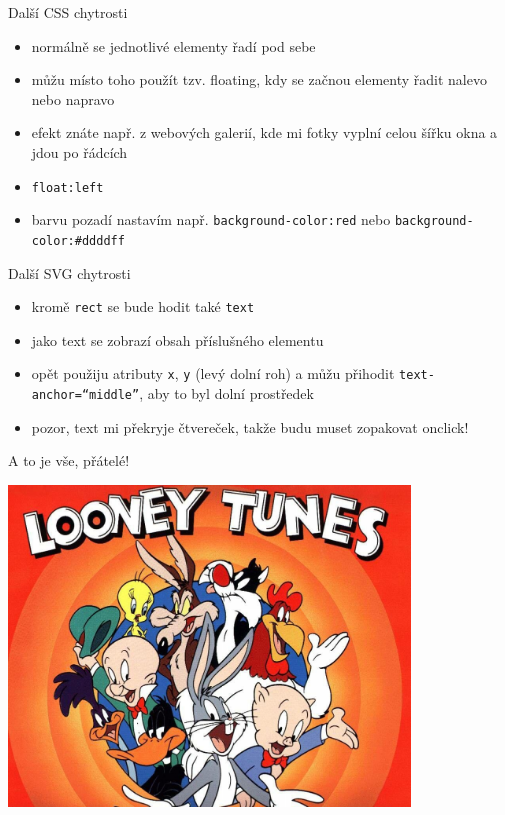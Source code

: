 \documentclass{beamer}
\begin{document}
\begin{frame}{Další CSS chytrosti}
  \begin{itemize}
    \item normálně se jednotlivé elementy řadí pod sebe
    \item můžu místo toho použít tzv. floating, kdy se začnou elementy řadit nalevo nebo napravo
    \item efekt znáte např. z webových galerií, kde mi fotky vyplní celou šířku okna a jdou po řádcích
    \item \texttt{float:left}
    \item barvu pozadí nastavím např. \texttt{background-color:red} nebo \texttt{background-color:\#ddddff}
  \end{itemize}
\end{frame}


\begin{frame}{Další SVG chytrosti}
  \begin{itemize}
    \item kromě \texttt{rect} se bude hodit také \texttt{text}
    \item jako text se zobrazí obsah příslušného elementu
    \item opět použiju atributy \texttt{x}, \texttt{y} (levý dolní roh) a můžu přihodit \texttt{text-anchor=``middle''}, aby to byl dolní prostředek
    \item pozor, text mi překryje čtvereček, takže budu muset zopakovat onclick!
  \end{itemize}
\end{frame}


\begin{frame}{A to je vše, přátelé!}
  \begin{center}
    \includegraphics[width=0.8\textwidth]{looney_tunes}
  \end{center}
\end{frame}
\end{document}
